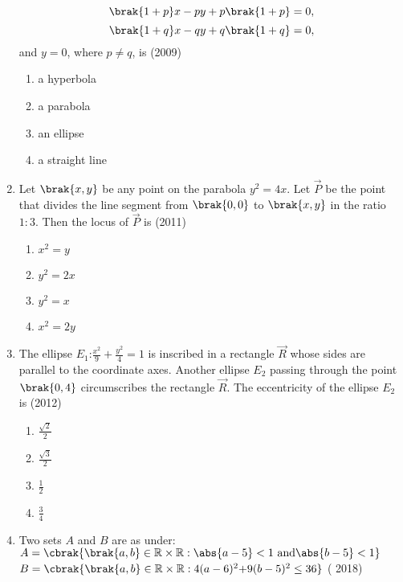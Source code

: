 \begin{enumerate}[label=\thesubsection.\arabic*.,ref=\thesubsection.\theenumi]
			$$\brak{1+p}x-py+p\brak{1+p}=0,$$
			$$\brak{1+q}x-qy+q\brak{1+q}=0,$$
		and $y=0$, where $p \neq q$, is
		\hfill(2009)
		\begin{multicols}{4}
\begin{enumerate}
	\item a hyperbola
	\item a parabola
	\item an ellipse
	\item a straight line
\end{enumerate}\end{multicols}
%
	\item Let $\brak{x,y}$ be any point on the parabola $y^2=4x$. Let $\vec{P}$ be the point that divides the line segment from $\brak{0,0}$ to $\brak{x,y}$ in the ratio $1:3$. Then the locus of $\vec{P}$ is  \hfill(2011)
		\begin{multicols}{4}
		\begin{enumerate}
			\item $x^2=y$
			\item $y^2=2x$
				\columnbreak
			\item $y^2=x$
			\item $x^2=2y$
		\end{enumerate}\end{multicols}
%
	\item The ellipse $E_{1}$:$\frac{x^2}{9}+\frac{y^2}{4}=1$ is inscribed in a rectangle $\vec{R}$ whose sides are parallel to the coordinate axes. Another ellipse $E_{2}$ passing through the point $\brak{0,4}$ circumscribes the rectangle $\vec{R}$. The eccentricity of the ellipse $E_{2}$ is \hfill(2012)
%
		\begin{multicols}{4}
		\begin{enumerate}
			\item $\frac{\sqrt{2}}{2}$
			\item $\frac{\sqrt{3}}{2}$
				\columnbreak
			\item $\frac{1}{2}$
			\item $\frac{3}{4}$
		\end{enumerate}\end{multicols}
%
\item  Two sets $A$ and $B$ are as under:
$A=\cbrak{\brak{a,b}\in\mathbb{R}\times\mathbb{R}:\abs{a-5}<1\text{ and} \abs{b-5}<1}$
$B=\cbrak{\brak{a,b}\in\mathbb{R}\times\mathbb{R}:4(a-6)^2\text{+}9(b-5)^2\leq36}$
    \hfill{( 2018)}
			\begin{multicols}{2}
	\begin{enumerate}

\end{enumerate}
\end{multicols}
\end{enumerate}
